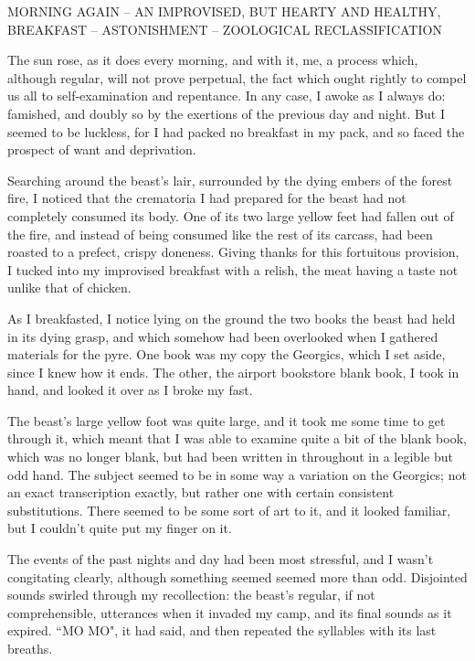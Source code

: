 \par
\begin{center}
MORNING AGAIN – AN IMPROVISED, BUT HEARTY AND HEALTHY, BREAKFAST – ASTONISHMENT – ZOOLOGICAL RECLASSIFICATION
\end{center}
\par
The sun rose, as it does every morning, and with it, me, a process which, although regular, will not prove perpetual, the fact which ought rightly to compel us all to self-examination and repentance.  In any case, I awoke as I always do: famished, and doubly so by the exertions of the previous day and night.  But I seemed to be luckless, for I had packed no breakfast in my pack, and so faced the prospect of want and deprivation.
\par
Searching around the beast's lair, surrounded by the dying embers of the forest fire, I noticed that the crematoria I had prepared for the beast had not completely consumed its body.  One of its two large yellow feet had fallen out of the fire, and instead of being consumed like the rest of its carcass, had been roasted to a prefect, crispy doneness.  Giving thanks for this fortuitous provision, I tucked into my improvised breakfast with a relish, the meat having a taste not unlike that of chicken.
\par
As I breakfasted, I notice lying on the ground the two books the beast had held in its dying grasp, and which somehow had been overlooked when I gathered materials for the pyre.  One book was my copy the Georgics, which I set aside, since I knew how it ends.  The other, the airport bookstore blank book, I took in hand, and looked it over as I broke my fast.
\par
The beast's large yellow foot was quite large, and it took me some time to get through it, which meant that I was able to examine quite a bit of the blank book, which was no longer blank, but had been written in throughout in a legible but odd hand.  The subject seemed to be in some way a variation on the Georgics; not an exact transcription exactly, but rather one with certain consistent substitutions.  There seemed to be some sort of art to it, and it looked familiar, but I couldn't quite put my finger on it.
\par
The events of the past nights and day had been most stressful, and I wasn't congitating clearly, although something seemed seemed more than odd.  Disjointed sounds swirled through my recollection: the beast's regular, if not comprehensible, utterances when it invaded my camp, and its final sounds as it expired.  ``MO MO", it had said, and then repeated the syllables with its last breaths.
